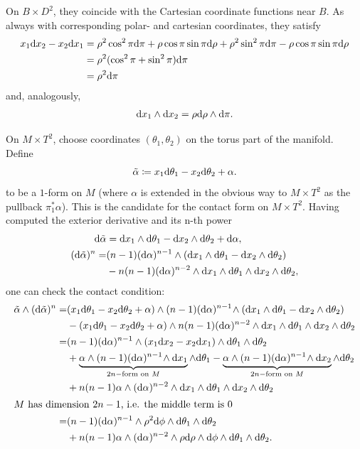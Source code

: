 On $B \times D^2$, they coincide with the Cartesian coordinate functions near $B$.
As always with corresponding polar- and cartesian coordinates, they satisfy
\begin{align*}
    x_1 \mathrm{d} x_2 - x_2 \mathrm{d} x_1 &= \rho^2 \cos^2 \pi \mathrm{d} \pi + \rho \cos \pi \sin \pi \mathrm{d} \rho + \rho^2 \sin^2 \pi \mathrm{d} \pi - \rho \cos \pi \sin \pi \mathrm{d} \rho\\
    &= \rho^2 (\cos^2 \pi + \sin^2 \pi) \mathrm{d} \pi\\
    &= \rho^2 \mathrm{d} \pi
\end{align*}
and, analogously,
\begin{align*}
    \mathrm{d} x_1 \wedge \mathrm{d} x_2 = \rho \mathrm{d} \rho \wedge \mathrm{d} \pi.
\end{align*}

On $M\times T^2$, choose coordinates $(\theta_1, \theta_2)$ on the torus part of the manifold.
Define
\[
    \tilde \alpha \coloneqq x_1 \mathrm{d} \theta_1 - x_2 \mathrm{d} \theta_2 + \alpha.
\]
to be a $1$-form on $M$ (where $\alpha$ is extended in the obvious way to $M\times T^2$ as the pullback $\pi_1^*\alpha$).
This is the candidate for the contact form on $M\times T^2$.
Having computed the exterior derivative and its n-th power
\begin{align*}
    \mathrm{d} \tilde \alpha &= \mathrm{d} x_1 \wedge \mathrm{d} \theta_1 - \mathrm{d} x_2 \wedge \mathrm{d} \theta_2 + \mathrm{d} \alpha,\\
    (\mathrm{d} \tilde \alpha)^n =& (n-1)(\mathrm{d} \alpha)^{n-1}\wedge (\mathrm{d} x_1 \wedge \mathrm{d} \theta_1 - \mathrm{d} x_2 \wedge \mathrm{d} \theta_2)\\
    &- n(n-1)(\mathrm{d} \alpha)^{n-2}\wedge \mathrm{d} x_1 \wedge \mathrm{d} \theta_1 \wedge \mathrm{d} x_2 \wedge \mathrm{d} \theta_2,
\end{align*}
one can check the contact condition:
\begin{align*}
    \tilde \alpha \wedge (\mathrm{d} \tilde \alpha)^n =& (x_1 \mathrm{d} \theta_1 - x_2 \mathrm{d} \theta_2 + \alpha) \wedge (n-1)(\mathrm{d} \alpha)^{n-1}\!\wedge (\mathrm{d} x_1 \wedge \mathrm{d} \theta_1 - \mathrm{d} x_2 \wedge \mathrm{d} \theta_2)\\
    &- (x_1 \mathrm{d} \theta_1 - x_2 \mathrm{d} \theta_2 + \alpha) \wedge n(n-1)(\mathrm{d} \alpha)^{n-2}\wedge \mathrm{d} x_1 \wedge \mathrm{d} \theta_1 \wedge \mathrm{d} x_2 \wedge \mathrm{d} \theta_2\\
    =& (n-1)(\mathrm{d} \alpha)^{n-1}\wedge(x_1\mathrm{d} x_2 - x_2 \mathrm{d} x_1)\wedge \mathrm{d} \theta_1 \wedge \mathrm{d} \theta_2\\
    &+\underbrace{\alpha\wedge(n-1)(\mathrm{d} \alpha)^{n-1}\!\wedge \mathrm{d} x_1}_{2n-\text{form on } M} \wedge \mathrm{d} \theta_1 - \underbrace{\alpha \wedge (n-1)(\mathrm{d} \alpha)^{n-1}\!\wedge\mathrm{d} x_2}_{2n-\text{form on } M} \wedge \mathrm{d} \theta_2\\
    & + n(n-1)\alpha\wedge(\mathrm{d} \alpha)^{n-2}\wedge \mathrm{d} x_1 \wedge \mathrm{d} \theta_1 \wedge \mathrm{d} x_2 \wedge \mathrm{d} \theta_2\\
    \intertext{$M$ has dimension $2n-1$, i.e. the middle term is 0}
    =& (n-1)(\mathrm{d} \alpha)^{n-1}\wedge \rho^2 \mathrm{d}\phi \wedge \mathrm{d} \theta_1 \wedge \mathrm{d} \theta_2\\
    & + n(n-1)\alpha \wedge (\mathrm{d} \alpha)^{n-2}\wedge \rho \mathrm{d}\rho \wedge \mathrm{d} \phi \wedge \mathrm{d} \theta_1 \wedge \mathrm{d} \theta_2.
\end{align*}
